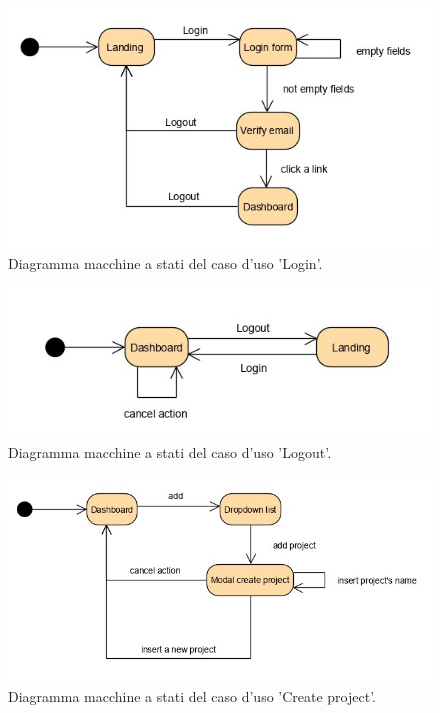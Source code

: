\begin{figure}[H]
	\centering
	\caption{Diagramma macchine a stati del caso d'uso 'Login'.}
	\label{fig:diagramma-macchine-stati:login}
	\includegraphics[width=\textwidth]{images/diagramma-macchine-stati/login}
\end{figure}
\begin{figure}[H]
	\centering

	\caption{Diagramma macchine a stati del caso d'uso 'Logout'.}
	\label{fig:diagramma-macchine-stati:logout}
	\includegraphics[width=\textwidth]{images/diagramma-macchine-stati/logout}
\end{figure}

\begin{figure}[H]
	\centering
	\caption{Diagramma macchine a stati del caso d'uso 'Create project'.}
	\label{fig:diagramma-macchine-stati:create-project}
	\includegraphics[width=\textwidth]{images/diagramma-macchine-stati/create-project}
\end{figure}

